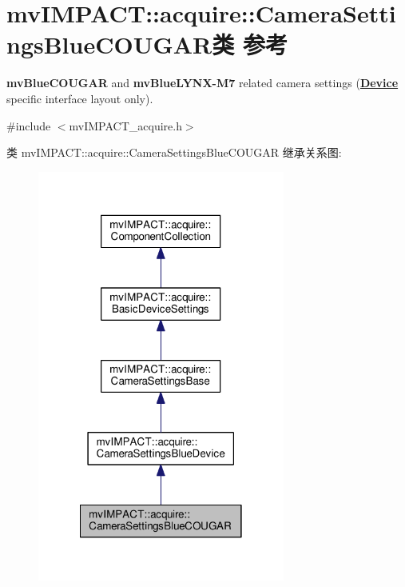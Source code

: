 \hypertarget{classmv_i_m_p_a_c_t_1_1acquire_1_1_camera_settings_blue_c_o_u_g_a_r}{\section{mv\+I\+M\+P\+A\+C\+T\+:\+:acquire\+:\+:Camera\+Settings\+Blue\+C\+O\+U\+G\+A\+R类 参考}
\label{classmv_i_m_p_a_c_t_1_1acquire_1_1_camera_settings_blue_c_o_u_g_a_r}
}


{\bfseries mv\+Blue\+C\+O\+U\+G\+A\+R} and {\bfseries mv\+Blue\+L\+Y\+N\+X-\/\+M7} related camera settings ({\bfseries \hyperlink{classmv_i_m_p_a_c_t_1_1acquire_1_1_device}{Device}} specific interface layout only).  




{\ttfamily \#include $<$mv\+I\+M\+P\+A\+C\+T\+\_\+acquire.\+h$>$}



类 mv\+I\+M\+P\+A\+C\+T\+:\+:acquire\+:\+:Camera\+Settings\+Blue\+C\+O\+U\+G\+A\+R 继承关系图\+:
\nopagebreak
\begin{figure}[H]
\begin{center}
\leavevmode
\includegraphics[width=230pt]{classmv_i_m_p_a_c_t_1_1acquire_1_1_camera_settings_blue_c_o_u_g_a_r__inherit__graph}
\end{center}
\end{figure}


